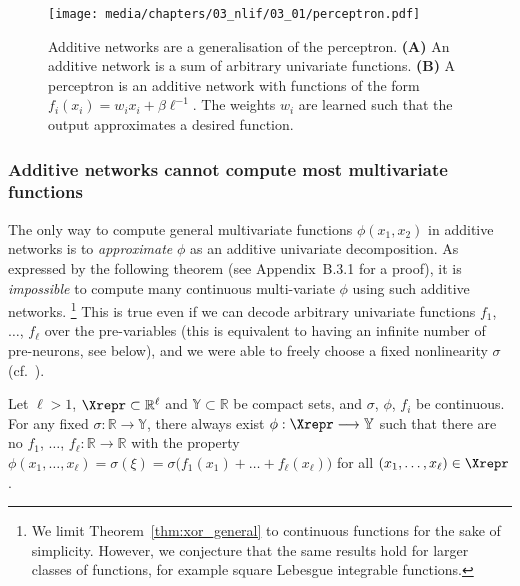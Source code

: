 \begin{figure}
	\centering
	\texttt{[image: media/chapters/03\_nlif/03\_01/perceptron.pdf]}%
	{\label{fig:perceptron_a}}%
	{\label{fig:perceptron_b}}%
	\caption[Additive networks are a generalisation of the perceptron]{Additive networks are a generalisation of the perceptron. \textbf{(A)} An additive network is a sum of arbitrary univariate functions. \textbf{(B)} A perceptron is an additive network with functions of the form $f_i(x_i) = w_i x_i + \beta \ell^{-1}$. The weights $w_i$ are learned such that the output approximates a desired function.}
\end{figure}

\subsubsection{Additive networks cannot compute most multivariate functions}
The only way to compute general multivariate functions $\phi(x_1, x_2)$ in additive networks is to \emph{approximate} $\phi$ as an additive univariate decomposition.
As expressed by the following theorem (see Appendix~B.3.1 for a proof), it is \emph{impossible} to compute many continuous multi-variate $\phi$ using such additive networks.%
\footnote{We limit Theorem~\ref{thm:xor_general} to continuous functions for the sake of simplicity.
However, we conjecture that the same results hold for larger classes of functions, for example square Lebesgue integrable functions.}
This is true even if we can decode arbitrary univariate functions $f_1$, $\ldots$, $f_\ell$ over the pre-variables (this is equivalent to having an infinite number of pre-neurons, see below), and we were able to freely choose a fixed nonlinearity $\sigma$ (cf.~).

\begin{theorem}
\label{thm:xor_general}
Let $\ell > 1$, $\Xrepr \subset \mathbb{R}^\ell$ and $\mathbb{Y} \subset \mathbb{R}$ be compact sets, and $\sigma$, $\phi$, $f_i$ be continuous.
For any fixed $\sigma : \mathbb{R} \longrightarrow \mathbb{Y}$, there always exist $\phi : \Xrepr \longrightarrow \mathbb{Y}$ such that there are no $f_1$, $\ldots$, $f_\ell : \mathbb{R}  \longrightarrow \mathbb{R}$ with the property
$\phi(x_1, \ldots, x_\ell) = \sigma(\xi) = \sigma\bigl( f_1(x_1) + \ldots + f_\ell(x_\ell) \bigr)$ for all $(x_1, \ldots, x_\ell) \in \Xrepr$.
\end{theorem}

